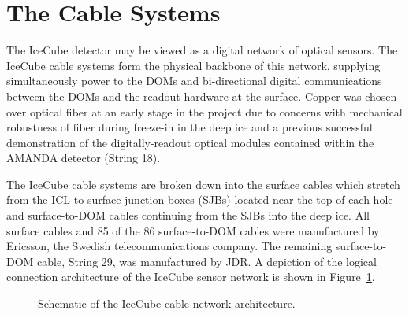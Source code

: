 
 
\section{The Cable Systems}

The IceCube detector may be viewed as a digital network of optical sensors.  The
IceCube cable systems form the physical backbone of this network, supplying
simultaneously power to the DOMs and bi-directional digital communications between
the DOMs and the readout hardware at the surface.  Copper was chosen over optical 
fiber at an early stage in the project due to concerns with mechanical robustness
of fiber during freeze-in in the deep ice and a previous successful demonstration 
of the digitally-readout optical modules contained within the AMANDA detector 
(String 18).

The IceCube cable systems are broken down into the surface cables which stretch
from the ICL to surface junction boxes (SJBs) located near the top of each hole and
surface-to-DOM cables continuing from the SJBs into the deep ice.  All surface
cables and 85 of the 86 surface-to-DOM cables were manufactured by Ericsson, the 
Swedish telecommunications company.  The remaining surface-to-DOM cable, String 29,
was manufactured by JDR.  A depiction of the logical connection architecture
of the IceCube sensor network is shown in Figure~\ref{fig:icecube-cables-logical}.

\begin{figure}
\fbox{\vspace{2in}}
\label{fig:icecube-cables-logical}
\caption{Schematic of the IceCube cable network architecture.}
\end{figure}

